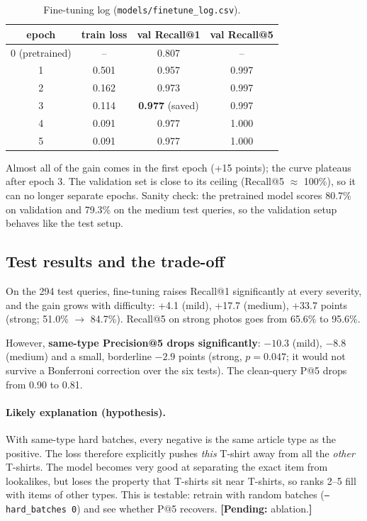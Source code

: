 \documentclass[11pt,a4paper]{article}
\newcommand{\pending}[1]{\textcolor{orange!80!black}{\textbf{[Pending:} #1\textbf{]}}}
\begin{document}
\begin{table}[H]
\centering
\begin{tabular}{cccc}
\toprule
epoch & train loss & val Recall@1 & val Recall@5 \\
\midrule
0 (pretrained) & --    & 0.807 & -- \\
1 & 0.501 & 0.957 & 0.997 \\
2 & 0.162 & 0.973 & 0.997 \\
3 & 0.114 & \textbf{0.977} (saved) & 0.997 \\
4 & 0.091 & 0.977 & 1.000 \\
5 & 0.091 & 0.977 & 1.000 \\
\bottomrule
\end{tabular}
\caption{Fine-tuning log (\texttt{models/finetune\_log.csv}).}
\end{table}

Almost all of the gain comes in the first epoch (+15 points); the curve plateaus after epoch 3.
The validation set is close to its ceiling (Recall@5 $\approx$ 100\%), so it can no longer separate
epochs. Sanity check: the pretrained model scores 80.7\% on validation and 79.3\% on the medium test
queries, so the validation setup behaves like the test setup.

\subsection{Test results and the trade-off}

On the 294 test queries, fine-tuning raises Recall@1 significantly at every severity, and the gain grows
with difficulty: +4.1 (mild), +17.7 (medium), +33.7 points (strong; 51.0\% $\to$ 84.7\%).
Recall@5 on strong photos goes from 65.6\% to 95.6\%.

However, \textbf{same-type Precision@5 drops significantly}: $-10.3$ (mild), $-8.8$ (medium) and a
small, borderline $-2.9$ points (strong, $p=0.047$; it would not survive a Bonferroni correction over
the six tests). The clean-query P@5 drops from 0.90 to 0.81.

\paragraph{Likely explanation (hypothesis).} With same-type hard batches, every negative is the same
article type as the positive. The loss therefore explicitly pushes \emph{this} T-shirt away from all
the \emph{other} T-shirts. The model becomes very good at separating the exact item from lookalikes,
but loses the property that T-shirts sit near T-shirts, so ranks 2--5 fill with items of other types.
This is testable: retrain with random batches (\texttt{--hard\_batches 0}) and see whether P@5
recovers. \pending{ablation.}
\end{document}
